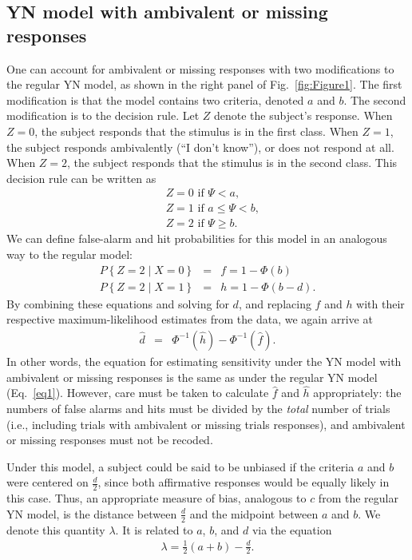\documentclass[man]{apa6}
\begin{document}
\subsection{YN model with ambivalent or missing responses}
One can account for ambivalent or missing responses with two modifications to the regular YN model, as shown in the right panel of Fig.~\ref{fig:Figure1}. The first modification is that the model contains two criteria, denoted $a$ and $b$. The second modification is to the decision rule. Let $Z$ denote the subject's response. When $Z=0$, the subject responds that the stimulus is in the first class. When $Z=1$, the subject responds ambivalently (``I don't know''), or does not respond at all. When $Z=2$, the subject responds that the stimulus is in the second class. This decision rule can be written as
\begin{eqnarray*}
&Z=0\textrm{ if }\Psi<a\textrm{,}\\
&Z=1\textrm{ if }a\le\Psi<b\textrm{,}\\
&Z=2\textrm{ if }\Psi\ge{}b\textrm{.}
\end{eqnarray*} 
We can define false-alarm and hit probabilities for this model in an analogous way to the regular model:
\begin{eqnarray*}
P\left\{Z=2\mid{}X=0\right\}&=&f=1-\Phi\left(b\right)\\
P\left\{Z=2\mid{}X=1\right\}&=&h=1-\Phi\left(b-d\right)\textrm{.}
\end{eqnarray*}
By combining these equations and solving for $d$, and replacing $f$ and $h$ with their respective maximum-likelihood estimates from the data, we again arrive at
\begin{eqnarray*}
\hat{d}&=&\Phi^{-1}\left(\hat{h}\right)-\Phi^{-1}\left(\hat{f}\right)\textrm{.}
\end{eqnarray*}In other words, the equation for estimating sensitivity under the YN model with ambivalent or missing responses is the same as under the regular YN model (Eq.~\ref{eq1}). However, care must be taken to calculate $\hat{f}$ and $\hat{h}$ appropriately: the numbers of false alarms and hits must be divided by the \emph{total} number of trials (i.e., including trials with ambivalent or missing trials responses), and ambivalent or missing responses must not be recoded.

Under this model, a subject could be said to be unbiased if the criteria $a$ and $b$ were centered on $\frac{d}{2}$, since both affirmative responses would be equally likely in this case. Thus, an appropriate measure of bias, analogous to $c$ from the regular YN model, is the distance between $\frac{d}{2}$ and the midpoint between $a$ and $b$. We denote this quantity $\lambda$. It is related to $a$, $b$, and $d$ via the equation
\begin{eqnarray*}\lambda=\frac{1}{2}\left(a+b\right)-\frac{d}{2}\textrm{.}\end{eqnarray*}
\end{document}
